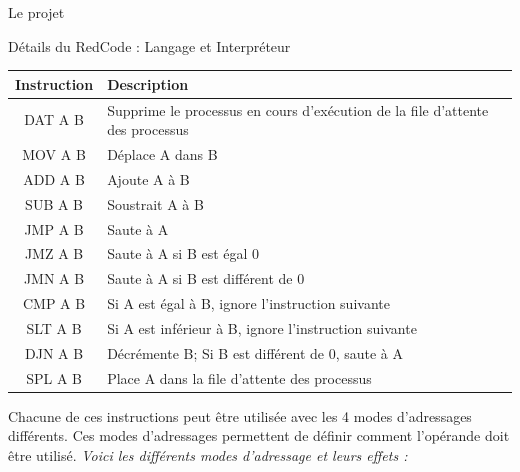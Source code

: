 \documentclass[a4paper, 10pt]{article}
\begin{document}
\begin{section}{Le projet}
\begin{subsection}{Détails du RedCode : Langage et Interpréteur}
                \begin{tabular}{|c|p{8cm}|}
                    \hline
                        \textbf{Instruction} & \textbf{Description} \\
                    \hline
                        DAT A B & Supprime le processus en cours d'exécution de la file d'attente des processus \\
                    \hline
                        MOV A B & Déplace A dans B \\
                    \hline
                        ADD A B & Ajoute A à B \\
                    \hline
                        SUB A B & Soustrait A à B \\
                    \hline
                        JMP A B & Saute à A \\
                    \hline
                        JMZ A B & Saute à A si B est égal 0\\
                    \hline
                        JMN A B & Saute à A si B est différent de 0 \\
                    \hline
                        CMP A B & Si A est égal à B, ignore l'instruction suivante\\
                    \hline
                        SLT A B & Si A est inférieur à B, ignore l'instruction suivante\\
                    \hline
                        DJN A B & Décrémente B; Si B est différent de 0, saute à A \\
                    \hline
                        SPL A B & Place A dans la file d'attente des processus \\
                    \hline
            \end{tabular}

            \bigskip
            Chacune de ces instructions peut être utilisée avec les 4 modes d'adressages différents. Ces modes d'adressages permettent de définir comment l'opérande doit être utilisé.
            \bigskip \newline
                \textit{Voici les différents modes d'adressage et leurs effets :}
            \bigskip


\end{subsection}
\end{section}
\end{document}
